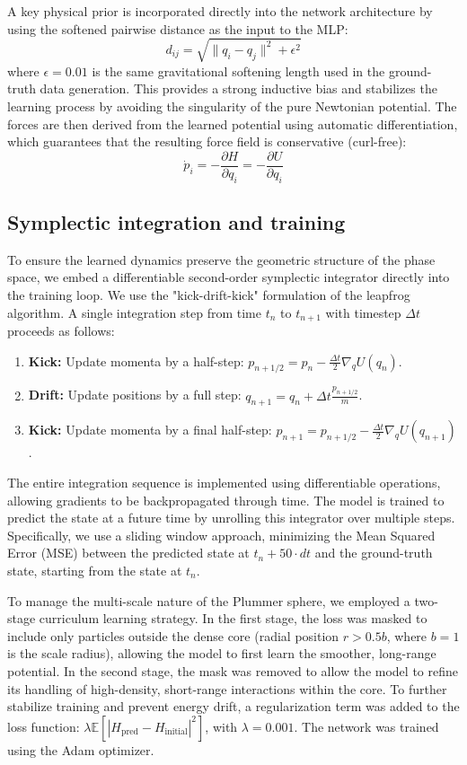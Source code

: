 \documentclass[]{article}
\begin{document}
A key physical prior is incorporated directly into the network architecture by using the softened pairwise distance as the input to the MLP:
\begin{equation}
    d_{ij} = \sqrt{\|q_i - q_j\|^2 + \epsilon^2}
\end{equation}
where $\epsilon=0.01$ is the same gravitational softening length used in the ground-truth data generation. This provides a strong inductive bias and stabilizes the learning process by avoiding the singularity of the pure Newtonian potential. The forces are then derived from the learned potential using automatic differentiation, which guarantees that the resulting force field is conservative (curl-free):
\begin{equation}
    \dot{p}_i = -\frac{\partial H}{\partial q_i} = -\frac{\partial U}{\partial q_i}
\end{equation}

\subsection{Symplectic integration and training}
To ensure the learned dynamics preserve the geometric structure of the phase space, we embed a differentiable second-order symplectic integrator directly into the training loop. We use the "kick-drift-kick" formulation of the leapfrog algorithm. A single integration step from time $t_n$ to $t_{n+1}$ with timestep $\Delta t$ proceeds as follows:
\begin{enumerate}
    \item \textbf{Kick:} Update momenta by a half-step: $p_{n+1/2} = p_n - \frac{\Delta t}{2} \nabla_q U(q_n)$.
    \item \textbf{Drift:} Update positions by a full step: $q_{n+1} = q_n + \Delta t \frac{p_{n+1/2}}{m}$.
    \item \textbf{Kick:} Update momenta by a final half-step: $p_{n+1} = p_{n+1/2} - \frac{\Delta t}{2} \nabla_q U(q_{n+1})$.
\end{enumerate}
The entire integration sequence is implemented using differentiable operations, allowing gradients to be backpropagated through time. The model is trained to predict the state at a future time by unrolling this integrator over multiple steps. Specifically, we use a sliding window approach, minimizing the Mean Squared Error (MSE) between the predicted state at $t_n + 50 \cdot dt$ and the ground-truth state, starting from the state at $t_n$.

To manage the multi-scale nature of the Plummer sphere, we employed a two-stage curriculum learning strategy. In the first stage, the loss was masked to include only particles outside the dense core (radial position $r > 0.5b$, where $b=1$ is the scale radius), allowing the model to first learn the smoother, long-range potential. In the second stage, the mask was removed to allow the model to refine its handling of high-density, short-range interactions within the core. To further stabilize training and prevent energy drift, a regularization term was added to the loss function: $\lambda \mathbb{E}[|H_{\text{pred}} - H_{\text{initial}}|^2]$, with $\lambda = 0.001$. The network was trained using the Adam optimizer.
\end{document}
